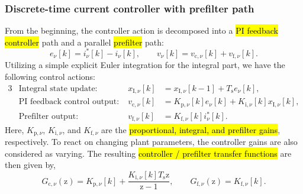 \begin{frame}
    \frametitle{Discrete-time current controller with prefilter path}
    From the beginning, the controller action is decomposed into a \hl{PI feedback controller} path and a parallel \hl{prefilter} path:
    \begin{equation}
        e_\nu[k]=i_\nu^{*}[k]-i_\nu[k],
        \qquad
        v_\nu[k]=v_{\mathrm{c},\nu}[k]+v_{\mathrm{f},\nu}[k].
    \end{equation}\pause%
    Utilizing a simple explicit Euler integration for the integral part, we have the following control actions:
    \begin{alignat}{3}
         & \text{Integral state update}: \quad      & x_{\mathrm{I},\nu}[k] & =x_{\mathrm{I},\nu}[k-1]+T_\mathrm{s}e_\nu[k],                             \\
         & \text{PI feedback control output}: \quad & v_{\mathrm{c},\nu}[k] & =K_{\mathrm{p},\nu}[k]e_\nu[k]+K_{\mathrm{i},\nu}[k]x_{\mathrm{I},\nu}[k], \\
         & \text{Prefilter output}: \quad           & v_{\mathrm{f},\nu}[k] & =K_{\mathrm{f},\nu}[k]i_\nu^{*}[k].
    \end{alignat}\pause%
    Here, $K_{\mathrm{p},\nu}$, $K_{\mathrm{i},\nu}$, and $K_{\mathrm{f},\nu}$ are the \hl{proportional, integral, and prefilter gains}, respectively. \pause To react on changing plant parameters, the controller gains are also considered as varying. The resulting \hl{controller / prefilter transfer functions} are then given by,
    \begin{equation}
        G_{\mathrm{c},\nu}(\mathrm{z})=K_{\mathrm{p},\nu}[k]+\frac{K_{\mathrm{i},\nu}[k]T_\mathrm{s}\mathrm{z}}{\mathrm{z}-1},
        \qquad
        G_{\mathrm{f},\nu}(\mathrm{z})=K_{\mathrm{f},\nu}[k].
    \end{equation}
\end{frame}



